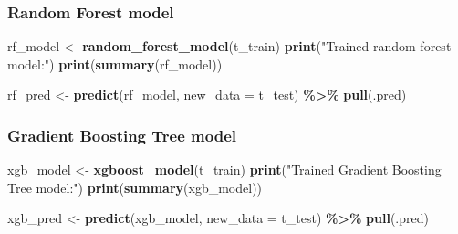 \documentclass[
]{article}
\newenvironment{Shaded}{\begin{snugshade}}{\end{snugshade}}
\newcommand{\AttributeTok}[1]{\textcolor[rgb]{0.13,0.29,0.53}{#1}}
\newcommand{\FunctionTok}[1]{\textcolor[rgb]{0.13,0.29,0.53}{\textbf{#1}}}
\newcommand{\NormalTok}[1]{#1}
\newcommand{\OtherTok}[1]{\textcolor[rgb]{0.56,0.35,0.01}{#1}}
\newcommand{\SpecialCharTok}[1]{\textcolor[rgb]{0.81,0.36,0.00}{\textbf{#1}}}
\newcommand{\StringTok}[1]{\textcolor[rgb]{0.31,0.60,0.02}{#1}}
\begin{document}
\subsubsection{Random Forest model}\label{random-forest-model}

\begin{Shaded}
\begin{Highlighting}[]
\NormalTok{rf\_model }\OtherTok{\textless{}{-}} \FunctionTok{random\_forest\_model}\NormalTok{(t\_train)}
  \FunctionTok{print}\NormalTok{(}\StringTok{"Trained random forest model:"}\NormalTok{)}
  \FunctionTok{print}\NormalTok{(}\FunctionTok{summary}\NormalTok{(rf\_model))}

\NormalTok{  rf\_pred }\OtherTok{\textless{}{-}} \FunctionTok{predict}\NormalTok{(rf\_model, }\AttributeTok{new\_data =}\NormalTok{ t\_test) }\SpecialCharTok{\%\textgreater{}\%} \FunctionTok{pull}\NormalTok{(.pred)}
\end{Highlighting}
\end{Shaded}

\subsubsection{Gradient Boosting Tree
model}\label{gradient-boosting-tree-model}

\begin{Shaded}
\begin{Highlighting}[]
\NormalTok{xgb\_model }\OtherTok{\textless{}{-}} \FunctionTok{xgboost\_model}\NormalTok{(t\_train)}
  \FunctionTok{print}\NormalTok{(}\StringTok{"Trained Gradient Boosting Tree model:"}\NormalTok{)}
  \FunctionTok{print}\NormalTok{(}\FunctionTok{summary}\NormalTok{(xgb\_model))}
  
\NormalTok{  xgb\_pred }\OtherTok{\textless{}{-}} \FunctionTok{predict}\NormalTok{(xgb\_model, }\AttributeTok{new\_data =}\NormalTok{ t\_test) }\SpecialCharTok{\%\textgreater{}\%} \FunctionTok{pull}\NormalTok{(.pred)}
\end{Highlighting}
\end{Shaded}

\begin{Shaded}
\end{Shaded}
\end{document}
